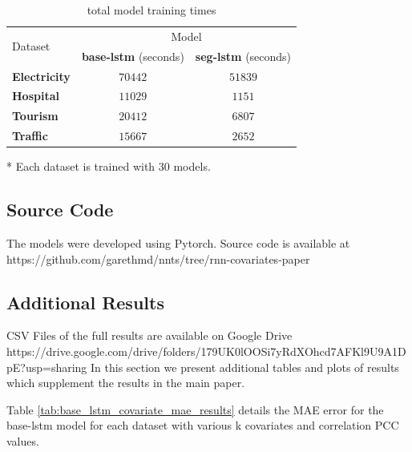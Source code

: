 \documentclass{article}
\begin{document}
\begin{table}[tbp]
  \caption{total model training times}
  \centering
  \begin{threeparttable}
  \begin{small}
  \renewcommand{\multirowsetup}{\centering}
  \setlength{\tabcolsep}{8pt}
  \begin{tabular}{lcc}
    \toprule
    \multirow{2}{*}{Dataset} & \multicolumn{2}{c}{Model} \\
    \cmidrule{2-3}
     & \textbf{base-lstm} (seconds) & \textbf{seg-lstm} (seconds)\\
    \midrule
    \multirow{1}{*}{\textbf{Electricity}} & $70442$ & $51839$ \\
    \midrule
    \multirow{1}{*}{\textbf{Hospital}} & $11029$ & $1151$ \\
    \midrule
    \multirow{1}{*}{\textbf{Tourism}} & $20412$ & $6807$ \\
    \midrule
    \multirow{1}{*}{\textbf{Traffic}} & $15667$ & $2652$ \\
    \bottomrule
  \end{tabular}
  \begin{tablenotes}
    \item[*] Each dataset is trained with 30 models.
  \end{tablenotes}
  \end{small}
  \end{threeparttable}
  \vspace{-15pt}
  \label{tab:training_time}
\end{table}

\subsection{Source Code}
The models were developed using Pytorch. Source code is available at \\
https://github.com/garethmd/nnts/tree/rnn-covariates-paper
\FloatBarrier

\subsection{Additional Results}
CSV Files of the full results are available on Google Drive \\
https://drive.google.com/drive/folders/179UK0lOOSi7yRdXOhcd7AFKl9U9A1DpE?usp=sharing
In this section we present additional tables and plots of results which supplement the results in the main paper. 

Table \ref{tab:base_lstm_covariate_mae_results} details
the MAE error for the base-lstm model for each dataset with various k covariates and correlation PCC values.  
\end{document}

